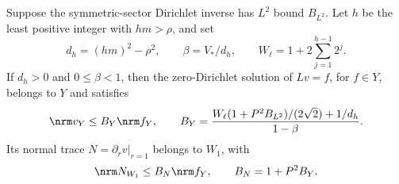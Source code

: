 \begin{proposition}\label{r2:prop:Yinverse}
Suppose the symmetric-sector Dirichlet inverse has $L^2$ bound $B_{L^2}$. Let $h$ be the least positive integer with $hm>\rho$, and set
\begin{equation}\label{r2:eq:high-constants}
 d_h=(hm)^2-\rho^2,\qquad\beta=V_*/d_h,
 \qquad W_\ell=1+2\sum_{j=1}^{h-1}2^j.
\end{equation}
If $d_h>0$ and $0\le\beta<1$, then the zero-Dirichlet solution of $Lv=f$, for $f\in Y$, belongs to $Y$ and satisfies
\begin{equation}\label{r2:eq:BY}
 \nrm v_Y\le B_Y\nrm f_Y,
 \qquad B_Y=\frac{W_\ell(1+P^2B_{L^2})/(2\sqrt2)+1/d_h}{1-\beta}.
\end{equation}
Its normal trace $N=\partial_rv|_{r=1}$ belongs to $W_1$, with
\begin{equation}\label{r2:eq:BN}
 \nrm N_{W_1}\le B_N\nrm f_Y,
 \qquad B_N=1+P^2B_Y.
\end{equation}
\end{proposition}
